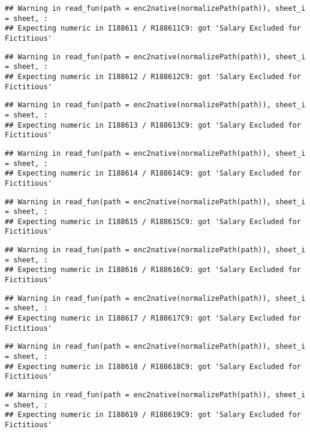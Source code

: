 \documentclass[
]{article}
\begin{document}
\begin{verbatim}
## Warning in read_fun(path = enc2native(normalizePath(path)), sheet_i = sheet, :
## Expecting numeric in I188611 / R188611C9: got 'Salary Excluded for Fictitious'
\end{verbatim}

\begin{verbatim}
## Warning in read_fun(path = enc2native(normalizePath(path)), sheet_i = sheet, :
## Expecting numeric in I188612 / R188612C9: got 'Salary Excluded for Fictitious'
\end{verbatim}

\begin{verbatim}
## Warning in read_fun(path = enc2native(normalizePath(path)), sheet_i = sheet, :
## Expecting numeric in I188613 / R188613C9: got 'Salary Excluded for Fictitious'
\end{verbatim}

\begin{verbatim}
## Warning in read_fun(path = enc2native(normalizePath(path)), sheet_i = sheet, :
## Expecting numeric in I188614 / R188614C9: got 'Salary Excluded for Fictitious'
\end{verbatim}

\begin{verbatim}
## Warning in read_fun(path = enc2native(normalizePath(path)), sheet_i = sheet, :
## Expecting numeric in I188615 / R188615C9: got 'Salary Excluded for Fictitious'
\end{verbatim}

\begin{verbatim}
## Warning in read_fun(path = enc2native(normalizePath(path)), sheet_i = sheet, :
## Expecting numeric in I188616 / R188616C9: got 'Salary Excluded for Fictitious'
\end{verbatim}

\begin{verbatim}
## Warning in read_fun(path = enc2native(normalizePath(path)), sheet_i = sheet, :
## Expecting numeric in I188617 / R188617C9: got 'Salary Excluded for Fictitious'
\end{verbatim}

\begin{verbatim}
## Warning in read_fun(path = enc2native(normalizePath(path)), sheet_i = sheet, :
## Expecting numeric in I188618 / R188618C9: got 'Salary Excluded for Fictitious'
\end{verbatim}

\begin{verbatim}
## Warning in read_fun(path = enc2native(normalizePath(path)), sheet_i = sheet, :
## Expecting numeric in I188619 / R188619C9: got 'Salary Excluded for Fictitious'
\end{verbatim}
\end{document}

